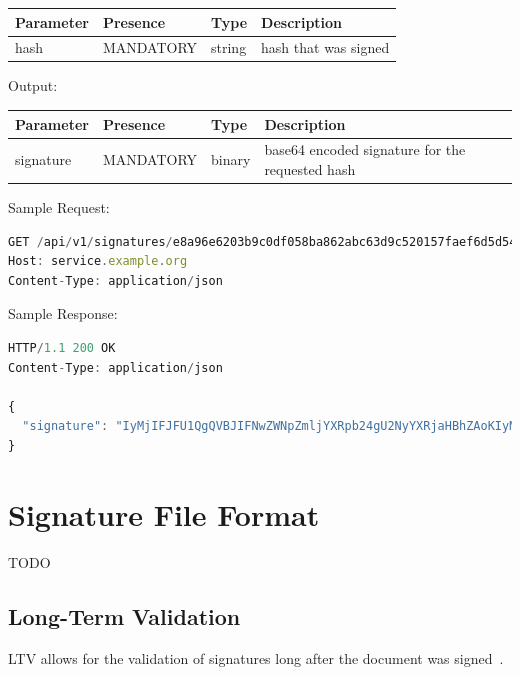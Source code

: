 \begin{tabular}{|l|l|l|l|}
	\hline
	Parameter & Presence & Type & Description \\ \hline
	hash & MANDATORY & string & hash that was signed \\ \hline
\end{tabular}

Output:

\begin{tabular}{|l|l|l|l|}
	\hline
	Parameter & Presence & Type & Description \\ \hline
	signature & MANDATORY & binary & base64 encoded signature for the requested hash \\ \hline
\end{tabular}

Sample Request:

\begin{lstlisting}[caption={signature request}, captionpos=b, language=JavaScript, label={lst:signaturerequest}]
GET /api/v1/signatures/e8a96e6203b9c0df058ba862abc63d9c520157faef6d5d54e54e526b0a85b2be HTTP/1.
Host: service.example.org
Content-Type: application/json
\end{lstlisting}

Sample Response:

\begin{lstlisting}[caption={signature response}, captionpos=b, language=JavaScript, label={lst:signatureresponse}]
HTTP/1.1 200 OK
Content-Type: application/json

{
  "signature": "IyMjIFJFU1QgQVBJIFNwZWNpZmljYXRpb24gU2NyYXRjaHBhZAoKIyMjIyBQcmUtQXV0aCBlbmRw...b2ludCAKIyMjIyMgRW5kcG9pbnQKYGBgUE9TVCAvYXBpL3YxL3NpZ25gYGAK"
}
\end{lstlisting}

\section{Signature File Format}
TODO
\subsection{Long-Term Validation}
\gls{LTV} allows for the validation of signatures long after the document was signed~\cite{etsipades}.

